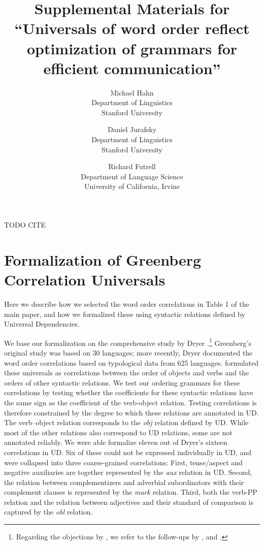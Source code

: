 \documentclass[10pt,twoside,lineno]{article}
\title{Supplemental Materials for ``Universals of word order reflect optimization of grammars for efficient communication''}
\author{
        Michael Hahn \\
                Department of Linguistics\\
       Stanford University
            \and
       Daniel Jurafsky\\
       Department of Linguistics\\
       Stanford University \\
       \and
       Richard Futrell\\
       Department of Language Science\\
       University of California, Irvine
}
\begin{document}
\maketitle




\tableofcontents



TODO CITE \cite{mielke-et-al-2019} %
\cite{gerz2018language}


\section{Formalization of Greenberg Correlation Universals}\label{sec:correlations}


Here we describe how we selected the word order correlations in Table 1 of the main paper, and how we formalized these using syntactic relations defined by Universal Dependencies.

We base our formalization on the comprehensive study by Dryer \cite{dryer1992greenbergian}.\footnote{Regarding the objections by \citet{dunn2011evolved}, we refer to the follow-ups by \citet{levy2011computational}, and \citet{croft2011greenbergian}.}
Greenberg's original study was based on 30 languages; more recently, Dryer \cite{dryer1992greenbergian} documented the word order correlations based on typological data from 625 languages.
\citet{dryer1992greenbergian} formulated these universals as correlations between the order of objects and verbs and the orders of other syntactic relations.
We test our ordering grammars for these correlations by testing whether the coefficients for these syntactic relations have the same sign as the coefficient of the verb-object relation.
Testing correlations is therefore constrained by the degree to which these relations are annotated in UD.
The verb--object relation corresponds to the  \emph{obj} relation defined by UD.
While most of the other relations also correspond to UD relations, some are not annotated reliably.
We were able formalize eleven out of Dryer's sixteen correlations in UD.
Six of these could not be expressed individually in UD, and were collapsed into three coarse-grained correlations:
First, tense/aspect and negative auxiliaries are together represented by the \emph{aux} relation in UD.
Second, the relation between complementizers and adverbial subordinators with their complement clauses is represented by the \emph{mark} relation.
Third, both the verb-PP relation and the relation between adjectives and their standard of comparison is captured by the \emph{obl} relation.
\end{document}
